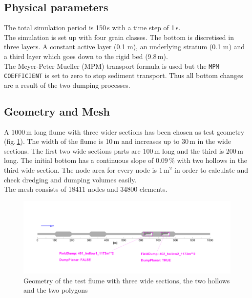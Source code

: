 \subsection{Physical parameters}
%
The total simulation period is 150\,s with a time step of 1\,s.\\
The simulation is set up with four grain classes.
The bottom is discretised in three layers. A constant active layer (0.1 m), an underlying stratum (0.1 m)
and a third layer which goes down to the rigid bed (9.8\,m).\\
The Meyer-Peter Mueller (MPM) transport formula is used but the \texttt{MPM COEFFICIENT} is set to zero to stop sediment transport.
Thus all bottom changes are a result of the two dumping processes.



\newpage
\subsection{Geometry and Mesh}
%
A 1000\,m long flume with three wider sections has been chosen as test geometry (fig.\,\ref{E2ini}).
The width of the flume is 10\,m and increases up to 30\,m in the wide sections.
The first two wide sections parts are 100\,m long and the third is 200\,m long.
The initial bottom has a continuous slope of 0.09\,\% with two hollows in the third wide section.
The node area for every node is 1\,m$^2$ in order to calculate and check dredging and dumping volumes easily.\\
The mesh consists of 18411 nodes and 34800 elements.

\begin{figure} [!h]
 \centering
 \includegraphics[scale=0.14]{img/result000.png}
 \caption{Geometry of the test flume with three wide sections, the two hollows and the two polygons}\label{E2ini}
\end{figure}


